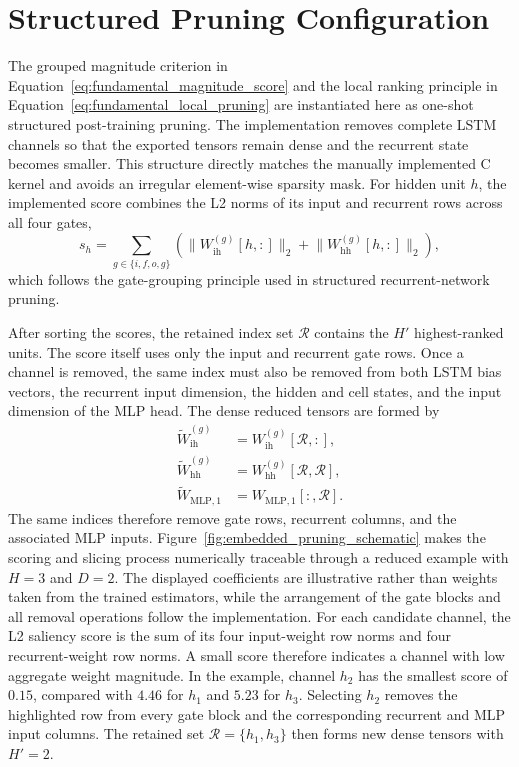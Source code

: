 \documentclass[
    a4paper,
    12pt,
    titlepage,
    bibliography=totoc,
    twoside=on,
    parskip=false,
    numbers=noenddot,
    cleardoublepage=empty,
    DIV=12,
    BCOR=12.0mm,
    headheight=36pt,
    headings=openright
]{scrreprt}
\begin{document}
\section{Structured Pruning Configuration}
\label{sec:embedded_pruning_configuration}
The grouped magnitude criterion in Equation~\ref{eq:fundamental_magnitude_score} and the local ranking principle in Equation~\ref{eq:fundamental_local_pruning} are instantiated here as one-shot structured post-training pruning. The implementation removes complete LSTM channels so that the exported tensors remain dense and the recurrent state becomes smaller. This structure directly matches the manually implemented C kernel and avoids an irregular element-wise sparsity mask. For hidden unit $h$, the implemented score combines the L2 norms of its input and recurrent rows across all four gates,
\begin{equation}
s_h=\sum_{g\in\{i,f,o,g\}}\left(\lVert W_{\mathrm{ih}}^{(g)}[h,:]\rVert_2+\lVert W_{\mathrm{hh}}^{(g)}[h,:]\rVert_2\right),
\label{eq:embedded_pruning_saliency}
\end{equation}
which follows the gate-grouping principle used in structured recurrent-network pruning.\autocite{wenLearningStructuredSparsity2016,lobachevaStructuredSparsificationGated2020,narangExploringSparsityRecurrent2017}

After sorting the scores, the retained index set $\mathcal R$ contains the $H'$ highest-ranked units. The score itself uses only the input and recurrent gate rows. Once a channel is removed, the same index must also be removed from both LSTM bias vectors, the recurrent input dimension, the hidden and cell states, and the input dimension of the MLP head. The dense reduced tensors are formed by
\begin{align}
    \widetilde W_{\mathrm{ih}}^{(g)}&=W_{\mathrm{ih}}^{(g)}[\mathcal R,:], \nonumber\\
    \widetilde W_{\mathrm{hh}}^{(g)}&=W_{\mathrm{hh}}^{(g)}[\mathcal R,\mathcal R], \nonumber\\
    \widetilde W_{\mathrm{MLP},1}&=W_{\mathrm{MLP},1}[:,\mathcal R].
    \label{eq:embedded_pruning_slicing}
\end{align}
The same indices therefore remove gate rows, recurrent columns, and the associated MLP inputs. Figure~\ref{fig:embedded_pruning_schematic} makes the scoring and slicing process numerically traceable through a reduced example with $H=3$ and $D=2$. The displayed coefficients are illustrative rather than weights taken from the trained estimators, while the arrangement of the gate blocks and all removal operations follow the implementation. For each candidate channel, the L2 saliency score is the sum of its four input-weight row norms and four recurrent-weight row norms. A small score therefore indicates a channel with low aggregate weight magnitude. In the example, channel $h_2$ has the smallest score of $0.15$, compared with $4.46$ for $h_1$ and $5.23$ for $h_3$. Selecting $h_2$ removes the highlighted row from every gate block and the corresponding recurrent and MLP input columns. The retained set $\mathcal R=\{h_1,h_3\}$ then forms new dense tensors with $H'=2$.
\end{document}
